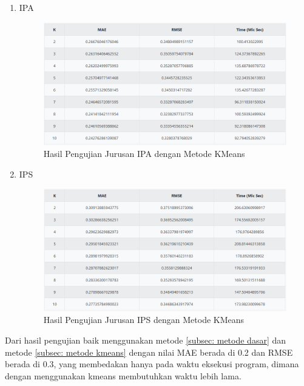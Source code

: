 \begin{enumerate}
    \item IPA
        \begin{figure}[H]
            \centering
            \includegraphics[width = 14cm, height =10 cm]{doc/DokumenSkripsi/Gambar/gambar57.PNG}
            \caption{Hasil Pengujian Jurusan IPA dengan Metode KMeans}
            \label{fig:pengujian ipa kmeans}
        \end{figure}
        
    \item IPS
        \begin{figure}[H]
            \centering
            \includegraphics[width = 14cm, height =10 cm]{doc/DokumenSkripsi/Gambar/gambar58.PNG}
            \caption{Hasil Pengujian Jurusan IPS dengan Metode KMeans}
            \label{fig:pengujian ips kmeans}
        \end{figure}
\end{enumerate}

Dari hasil pengujian baik menggunakan metode \ref{subsec: metode dasar} dan metode \ref{subsec: metode kmeans} dengan nilai MAE berada di 0.2 dan RMSE berada di 0.3, yang membedakan hanya pada waktu eksekusi program, dimana dengan menggunakan kmeans membutuhkan waktu lebih lama.
